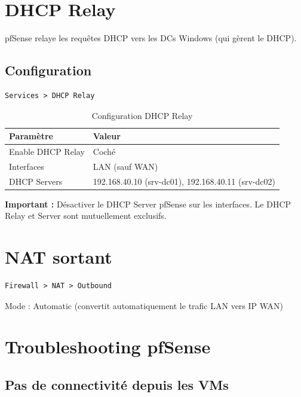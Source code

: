 \section{DHCP Relay}

pfSense relaye les requêtes DHCP vers les DCs Windows (qui gèrent le DHCP).

\subsection{Configuration}

\begin{lstlisting}
Services > DHCP Relay
\end{lstlisting}

\begin{table}[H]
    \centering
    \begin{tabularx}{\textwidth}{|l|p{5cm}|}
        \hline
        \textbf{Paramètre} & \textbf{Valeur} \\
        \hline
        Enable DHCP Relay & Coché \\
        \hline
        Interfaces & LAN (sauf WAN) \\
        \hline
        DHCP Servers & 192.168.40.10 (srv-dc01), 192.168.40.11 (srv-dc02) \\
        \hline
    \end{tabularx}
    \caption{Configuration DHCP Relay}
    \label{tab:dhcp-relay}
\end{table}

\textbf{Important :} Désactiver le DHCP Server pfSense sur les interfaces. Le DHCP Relay et Server sont mutuellement exclusifs.

\section{NAT sortant}

\begin{lstlisting}
Firewall > NAT > Outbound
\end{lstlisting}

Mode : Automatic (convertit automatiquement le trafic LAN vers IP WAN)

\section{Troubleshooting pfSense}

\subsection{Pas de connectivité depuis les VMs}

